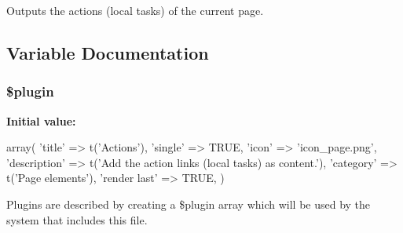 Outputs the actions (local tasks) of the current page. 

\subsection{Variable Documentation}
\hypertarget{page__actions_8inc_ada8a7130088351710bb02ed622d6bf65}{
\subsubsection[{\$plugin}]{\setlength{\rightskip}{0pt plus 5cm}\$plugin}}
\label{page__actions_8inc_ada8a7130088351710bb02ed622d6bf65}
{\bfseries Initial value:}
\begin{DoxyCode}
 array(
  'title' => t('Actions'),
  'single' => TRUE,
  'icon' => 'icon_page.png',
  'description' => t('Add the action links (local tasks) as content.'),
  'category' => t('Page elements'),
  'render last' => TRUE,
)
\end{DoxyCode}
Plugins are described by creating a \$plugin array which will be used by the system that includes this file. 